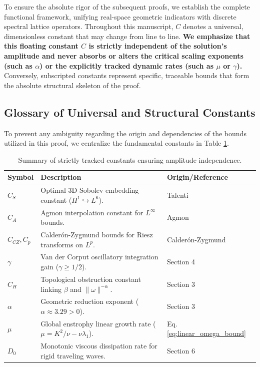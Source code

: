 \documentclass[12pt,a4paper]{article}
\theoremstyle{plain}
\theoremstyle{definition}
\theoremstyle{remark}
\begin{document}
To ensure the absolute rigor of the subsequent proofs, we establish the complete functional framework, unifying real-space geometric indicators with discrete spectral lattice operators. Throughout this manuscript, $C$ denotes a universal, dimensionless constant that may change from line to line. \textbf{We emphasize that this floating constant $C$ is strictly independent of the solution's amplitude and never absorbs or alters the critical scaling exponents (such as $\alpha$) or the explicitly tracked dynamic rates (such as $\mu$ or $\gamma$).} Conversely, subscripted constants represent specific, traceable bounds that form the absolute structural skeleton of the proof.

\subsection*{Glossary of Universal and Structural Constants}
To prevent any ambiguity regarding the origin and dependencies of the bounds utilized in this proof, we centralize the fundamental constants in Table \ref{tab:constants}.
\begin{table}[ht]
\centering
\begin{tabular}{lp{8.5cm}l}
\toprule
\textbf{Symbol} & \textbf{Description} & \textbf{Origin/Reference} \\
\midrule
$C_S$ & Optimal 3D Sobolev embedding constant ($H^1 \hookrightarrow L^6$). & Talenti \cite{talenti1976} \\
$C_A$ & Agmon interpolation constant for $L^\infty$ bounds. & Agmon \cite{agmon1965} \\
$C_{CZ}, C_p$ & Calderón-Zygmund bounds for Riesz transforms on $L^p$. & Calderón-Zygmund \cite{calderon1952} \\
$\gamma$ & Van der Corput oscillatory integration gain ($\gamma \ge 1/2$). & Section 4 \\
$C_H$ & Topological obstruction constant linking $\beta$ and $\|\omega\|^{-\alpha}$. & Section 3 \\
$\alpha$ & Geometric reduction exponent ($\alpha \approx 3.29 > 0$). & Section 3 \\
$\mu$ & Global enstrophy linear growth rate ($\mu = K^2/\nu - \nu\lambda_1$). & Eq. \eqref{eq:linear_omega_bound} \\
$D_0$ & Monotonic viscous dissipation rate for rigid traveling waves. & Section 6 \\
\bottomrule
\end{tabular}
\caption{Summary of strictly tracked constants ensuring amplitude independence.}
\label{tab:constants}
\end{table}
\end{document}
